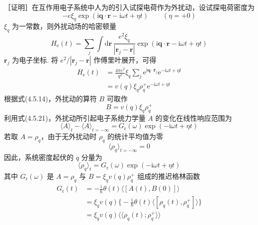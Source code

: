 ［证明］在互作用电子系统中人为的引入试探电荷作为外扰动，设试探电荷密度为
\begin{equation*}
-e\xi_{q}\exp(\mathrm{i}\boldsymbol{q}\cdot\boldsymbol{r}
-\mathrm{i}\omega t+\eta t)\qquad(\eta=+0)
\end{equation*}
$\xi_{q}$ 为一常数，则外扰动场的哈密顿量
\begin{equation*}
H_{\mathrm{e}}(t)=\sum_{j}\int\mathrm{d}\boldsymbol{r}\,
\frac{e^{2}\xi_{q}}{|\boldsymbol{r}_{j}-\boldsymbol{r}|}
\exp(\mathrm{i}\boldsymbol{q}\cdot\boldsymbol{r}
-\mathrm{i}\omega t+\eta t)
\end{equation*}
$\boldsymbol{r}_{j}$ 为电子坐标. 将 $e^{2}/|\boldsymbol{r}_{j}-\boldsymbol{r}|$ 作傅里叶展开，可得
\begin{equation}
\begin{aligned}
H_{\mathrm{e}}(t)&=\frac{4\pi e^{2}}{q^{2}}\xi_{q}\sum_{j}
\mathrm{e}^{\mathrm{i}\boldsymbol{q}\cdot\boldsymbol{r}_{j}}
\mathrm{e}^{-\mathrm{i}\omega t+\eta t}\\
&=v(q)\xi_{q}\rho_{q}^{+}\mathrm{e}^{-\mathrm{i}\omega t+\eta t}
\end{aligned}
\end{equation}
根据式(4.5.14)，外扰动的算符 $B$ 可取作
\begin{equation}
B=v(q)\xi_{q}\rho_{q}^{+}
\end{equation}
利用式(4.5.21)，外扰动所引起电子系统力学量 $A$ 的变化在线性响应范围为
\begin{equation*}
\langle A\rangle_{t}-\langle A\rangle_{t=-\infty}
=G_{\mathrm{r}}(\omega)\exp(-\mathrm{i}\omega t+\eta t)
\end{equation*}
若取 $A=\rho_{q}$，由于无外扰动时 $\rho_{q}$ 的统计平均值为零
\begin{equation*}
\langle\rho_{q}\rangle_{t=-\infty}=0
\end{equation*}
因此，系统密度起伏的 $q$ 分量为
\begin{equation}
\langle\rho_{q}\rangle_{t}=G_{\mathrm{r}}(\omega)
\exp(-\mathrm{i}\omega t+\eta t)
\end{equation}
其中 $G_{\mathrm{r}}(\omega)$ 是 $A=\rho_{q}$ 与 $B=\xi_{q}v(q)\rho_{q}^{+}$ 组成的推迟格林函数
\begin{equation}
\begin{aligned}
G_{\mathrm{r}}(t)&=-\frac{\mathrm{i}}{\hbar}\theta(t)
\langle[A(t),B(0)]\rangle\\
&=\xi_{q}v(q)\biggl\{-\frac{\mathrm{i}}{\hbar}\theta(t)
\langle[\rho_{q}(t),\rho_{q}^{+}]\rangle\biggr\}\\
&=\xi_{q}v(q)\langle\langle\rho_{q}(t);\rho_{q}^{+}\rangle\rangle
\end{aligned}
\end{equation}
